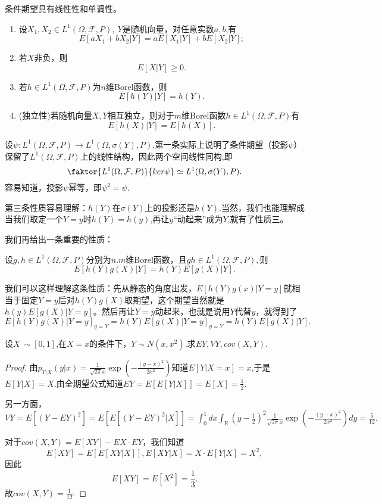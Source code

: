 \documentclass[lang=cn,10pt]{elegantbook}
\begin{document}
	条件期望具有线性性和单调性。
	\begin{property}
		\begin{enumerate}
			\item 设\(X_1,X_2\in L^1(\Omega,\mathcal{F},P),\ Y\)是随机向量，对任意实数\(a,b\),有
			\[E[aX_1+bX_2|Y]=aE[X_1|Y]+bE[X_2|Y];\]
			\item 若\(X\)非负，则
			\[E[X|Y]\ge0.\]
			\item  若\(h\in L^1(\Omega,\mathcal{F},P)\)为\(n\)维Borel函数，则
			\[E[h(Y)|Y]=h(Y).\]
			\item (独立性)若随机向量\(X,Y\)相互独立，则对于\(m\)维Borel函数\(h\in L^1(\Omega,\mathcal{F},P)\)有
			\[E[h(X)|Y]=E[h(X)].\]
		\end{enumerate}
	\end{property}
	\begin{note}
		设\(\psi:L^1(\Omega,\mathcal{F},P)\to L^1(\Omega,\sigma(Y),P)\),第一条实际上说明了条件期望（投影\(\psi\)）保留了\(L^1(\Omega,\mathcal{F},P)\)上的线性结构，因此两个空间线性同构,即
		\[\faktor{L^1(\Omega,\mathcal{F},P)}{ker \psi}\simeq L^1(\Omega,\sigma(Y),P).\]
		容易知道，投影\(\psi\)幂等，即\(\psi^2=\psi.\)
		
		第三条性质容易理解：\(h(Y)\)在\(\sigma(Y)\)上的投影还是\(h(Y)\).当然，我们也能理解成当我们取定一个\(Y=y\)时\(h(Y)=h(y)\),再让\(y\)“动起来”成为\(Y\),就有了性质三。
	\end{note}
	我们再给出一条重要的性质：
	\begin{property}
		设\(g,h\in L^1(\Omega,\mathcal{F},P)\)分别为\(n.m\)维Borel函数，且\(gh\in L^1(\Omega,\mathcal{F},P),\)则
		\[E[h(Y)g(X)|Y]=h(Y)E[g(X)|Y].\]
	\end{property}
	\begin{note}
		我们可以这样理解这条性质：先从静态的角度出发，\(E[h(Y)g(x)|Y=y]\)就相当于固定\(Y=y\)后对\(h(Y)g(X)\)取期望，这个期望当然就是\(h(y)E[g(X)|Y=y]\)。然后再让\(Y=y\)动起来，也就是说用\(Y\)代替\(y\)，就得到了\(E[h(Y)g(X)|Y=y]_{y=Y}=h(Y)E[g(X)|Y=y]_{y=Y}=h(Y)E[g(X)|Y].\)
	\end{note}
	\begin{example}
		设\(X~\sim [0,1]\),在\(X=x\)的条件下，\(Y\sim N(x,x^2)\).求\(EY,VY,cov(X,Y)\).
	\end{example}
	\begin{proof}
		由\(p_{Y|X}(y|x)=\frac{1}{\sqrt{2\pi}x}\exp{(-\frac{(y-x)^2}{2x^2})}\)知道\(E[Y|X=x]=x\),于是\(E[Y|X]=X\).由全期望公式知道\(EY=E[E[Y|X]]=E[X]=\frac{1}{2}\).
		
		另一方面，\(VY=E[(Y-EY)^2]=E[E[(Y-EY)^2|X]]=\int_{0}^{1}dx\int_\mathbb{R}(y-\frac{1}{2})^2\frac{1}{\sqrt{2\pi}x}\exp{(-\frac{(y-x)^2}{2x^2})}dy=\frac{5}{12}.\)
		
		对于\(cov(X,Y)=E[XY]-EX\cdot EY\)，我们知道
		\[E[XY]=E[E[XY|X]],E[XY|X]=X\cdot E[Y|X]=X^2,\]
		因此
		\[E[XY]=E[X^2]=\frac{1}{3}.\]
		故\(cov(X,Y)=\frac{1}{12}\).
	\end{proof}
	
\end{document}
